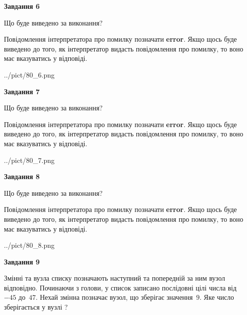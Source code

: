 \documentclass[12pt, ukrainian]{article}
\begin{document}
{\begin {large}
{\begin {center}\textbf{Завдання 6}\end {center}}\par
Що буде виведено за виконання?

Повідомлення інтерпретатора про помилку позначати \textbf{error}.
Якщо щось буде виведено до того, як інтерпретатор видасть повідомлення про помилку, 
то воно має вказуватись у відповіді. \par


\begin{center}
	{../pict/80_6.png}
\end{center}
\newpage

{\begin {center}\textbf{Завдання 7}\end {center}}\par
Що буде виведено за виконання?

Повідомлення інтерпретатора про помилку позначати \textbf{error}.
Якщо щось буде виведено до того, як інтерпретатор видасть повідомлення про помилку, 
то воно має вказуватись у відповіді. \par


\begin{center}
	{../pict/80_7.png}
\end{center}
\newpage

{\begin {center}\textbf{Завдання 8}\end {center}}\par
Що буде виведено за виконання?

Повідомлення інтерпретатора про помилку позначати \textbf{error}.
Якщо щось буде виведено до того, як інтерпретатор видасть повідомлення про помилку, 
то воно має вказуватись у відповіді. \par


\begin{center}
	{../pict/80_8.png}
\end{center}
\newpage

{\begin {center}\textbf{Завдання 9}\end {center}}\par
Змінні  та  вузла списку позначають наступний та попередній за ним вузол відповідно. Починаючи з голови, у список записано послідовні цілі числа від~$-45$ до~$47$. Нехай змінна  позначає вузол, що зберігає значення~$9$.
Яке число зберігається у вузлі  ?\par
\newpage


\end{large}}
\end{document}
